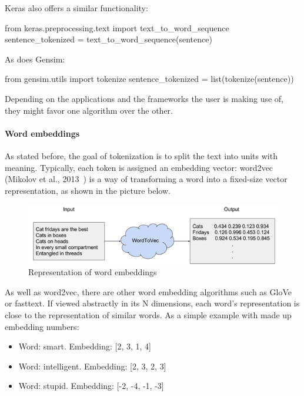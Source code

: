 Keras also offers a similar functionality:

\begin{python}
from keras.preprocessing.text import text_to_word_sequence
sentence_tokenized = text_to_word_sequence(sentence)
\end{python}

As does Gensim:

\begin{python}
from gensim.utils import tokenize
sentence_tokenized = list(tokenize(sentence))
\end{python}

Depending on the applications and the frameworks the user is making use of, they might favor one algorithm over the other.

\paragraph{Word embeddings}\label{subsec:wordemb}

As stated before, the goal of tokenization is to split the text into units with meaning. Typically, each token is assigned an embedding vector: word2vec (Mikolov et al., 2013~\cite{mikolov2013efficient}) is a way of transforming a word into a fixed-size vector representation, as shown in the picture below.

\begin{figure}[!ht]
    \centering
    \includegraphics[width=12cm]{figures/word_emb.png}
    \caption{Representation of word embeddings}
\end{figure}

As well as word2vec, there are other word embedding algorithms such as GloVe or fasttext. If viewed abstractly in its N dimensions, each word's representation is close to the representation of similar words. As a simple example with made up embedding numbers:

\begin{itemize}
    \item Word: smart. Embedding: [2, 3, 1, 4]
    \item Word: intelligent. Embedding: [2, 3, 2, 3]
    \item Word: stupid. Embedding: [-2, -4, -1, -3]
\end{itemize}

